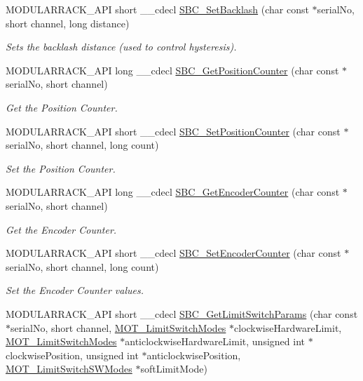 \begin{DoxyCompactItemize}
M\+O\+D\+U\+L\+A\+R\+R\+A\+C\+K\+\_\+\+A\+PI short \+\_\+\+\_\+cdecl \hyperlink{group___modular_stepper_gaf6385cd2aa32836ca063c32aa1b1504e}{S\+B\+C\+\_\+\+Set\+Backlash} (char const $\ast$serial\+No, short channel, long distance)
\begin{DoxyCompactList}\small\item\em Sets the backlash distance (used to control hysteresis). \end{DoxyCompactList}\item 
M\+O\+D\+U\+L\+A\+R\+R\+A\+C\+K\+\_\+\+A\+PI long \+\_\+\+\_\+cdecl \hyperlink{group___modular_stepper_ga60b4e124f2e1461ab0b695b7d30905bf}{S\+B\+C\+\_\+\+Get\+Position\+Counter} (char const $\ast$serial\+No, short channel)
\begin{DoxyCompactList}\small\item\em Get the Position Counter. \end{DoxyCompactList}\item 
M\+O\+D\+U\+L\+A\+R\+R\+A\+C\+K\+\_\+\+A\+PI short \+\_\+\+\_\+cdecl \hyperlink{group___modular_stepper_gacadd316fd92bf14d08159faa5484db03}{S\+B\+C\+\_\+\+Set\+Position\+Counter} (char const $\ast$serial\+No, short channel, long count)
\begin{DoxyCompactList}\small\item\em Set the Position Counter. \end{DoxyCompactList}\item 
M\+O\+D\+U\+L\+A\+R\+R\+A\+C\+K\+\_\+\+A\+PI long \+\_\+\+\_\+cdecl \hyperlink{group___modular_stepper_ga7f989cc457a5673ee4e89881f625c0d7}{S\+B\+C\+\_\+\+Get\+Encoder\+Counter} (char const $\ast$serial\+No, short channel)
\begin{DoxyCompactList}\small\item\em Get the Encoder Counter. \end{DoxyCompactList}\item 
M\+O\+D\+U\+L\+A\+R\+R\+A\+C\+K\+\_\+\+A\+PI short \+\_\+\+\_\+cdecl \hyperlink{group___modular_stepper_gacf82d9ffc109b7a3f993e57e0e1b3435}{S\+B\+C\+\_\+\+Set\+Encoder\+Counter} (char const $\ast$serial\+No, short channel, long count)
\begin{DoxyCompactList}\small\item\em Set the Encoder Counter values. \end{DoxyCompactList}\item 
M\+O\+D\+U\+L\+A\+R\+R\+A\+C\+K\+\_\+\+A\+PI short \+\_\+\+\_\+cdecl \hyperlink{group___modular_stepper_ga9b33a7706f23a8dd5907a6a8afdbb21a}{S\+B\+C\+\_\+\+Get\+Limit\+Switch\+Params} (char const $\ast$serial\+No, short channel, \hyperlink{group___common_ga682c3ff98dc472fbdc3cbc3267d38796}{M\+O\+T\+\_\+\+Limit\+Switch\+Modes} $\ast$clockwise\+Hardware\+Limit, \hyperlink{group___common_ga682c3ff98dc472fbdc3cbc3267d38796}{M\+O\+T\+\_\+\+Limit\+Switch\+Modes} $\ast$anticlockwise\+Hardware\+Limit, unsigned int $\ast$clockwise\+Position, unsigned int $\ast$anticlockwise\+Position, \hyperlink{group___common_ga7d4db5fc799ed3fd24818bff565afd85}{M\+O\+T\+\_\+\+Limit\+Switch\+S\+W\+Modes} $\ast$soft\+Limit\+Mode)

\end{DoxyCompactItemize}
